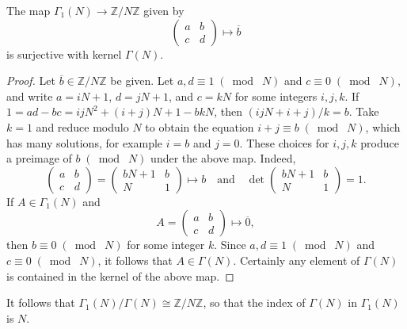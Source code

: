 \documentclass[10pt,leqno]{article}
\theoremstyle{plain}
\theoremstyle{definition}
\numberwithin{equation}{section}
\numberwithin{lem}{section}
\newcommand{\smod}[1]{\;(\bmod\; #1)}
\begin{document}
The map $\varGamma_1(N)\to \mathbb{Z}/N\mathbb{Z}$ given by \[\begin{pmatrix}
    a & b \\ c & d
\end{pmatrix}\mapsto \overline b\] is surjective with kernel $\varGamma(N)$. 
\begin{proof}
    Let $\overline b\in\mathbb{Z}/N\mathbb{Z}$ be given. Let $a,d\equiv 1\smod N$ and $c\equiv 0\smod N$, and write $a= iN+1$, $d = jN+1$, and $c = kN$ for some integers $i,j,k$. If $1= ad-bc = ijN^2 + (i+j)N + 1 - bkN$, then $(ijN+ i + j)/k = b$. Take $k=1$ and reduce modulo $N$ to obtain the equation $i+j\equiv b \smod N$, which has many solutions, for example $i = b$ and $j =0$. These choices for $i,j,k$ produce a preimage of $b\smod N$ under the above map. Indeed, \[\begin{pmatrix}
        a & b \\ c & d
    \end{pmatrix} = \begin{pmatrix}
        bN+1 & b \\ N & 1
    \end{pmatrix}\mapsto b\quad\text{and}\quad \det\begin{pmatrix}
        bN+1 & b \\ N & 1
    \end{pmatrix} = 1.\]
    If $A\in \varGamma_1(N)$ and \[A = \begin{pmatrix}
        a & b \\ c & d
    \end{pmatrix}\mapsto \overline 0,\] then $b \equiv 0\smod N$ for some integer $k$. Since $a,d\equiv 1\smod N$ and $c\equiv 0\smod N$, it follows that $A\in \varGamma(N)$. Certainly any element of $\varGamma(N)$ is contained in the kernel of the above map.
\end{proof} 
It follows that $\varGamma_1(N)/\varGamma(N)\cong \mathbb{Z}/N\mathbb{Z}$, so that the index of $\varGamma(N)$ in $\varGamma_1(N)$ is $N$.
\end{document}
